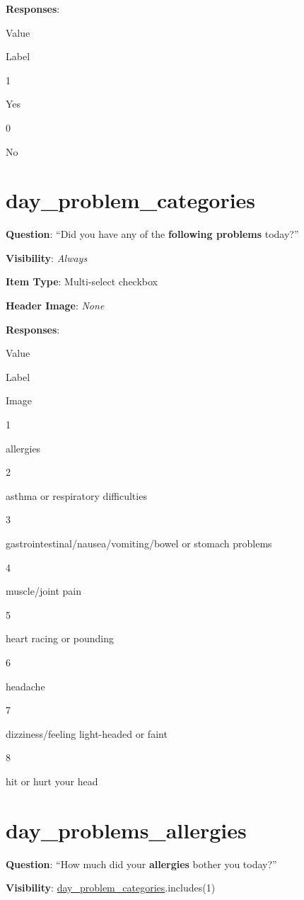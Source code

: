 \documentclass[]{book}
\begin{document}
\textbf{Responses}:

Value

Label

1

Yes

0

No

\hypertarget{day_problem_categories}{%
\section{day\_problem\_categories}\label{day_problem_categories}}

\textbf{Question}: ``Did you have any of the \textbf{following problems} today?''

\textbf{Visibility}: \emph{Always}

\textbf{Item Type}: Multi-select checkbox

\textbf{Header Image}: \emph{None}

\textbf{Responses}:

Value

Label

Image

1

allergies

2

asthma or respiratory difficulties

3

gastrointestinal/nausea/vomiting/bowel or stomach problems

4

muscle/joint pain

5

heart racing or pounding

6

headache

7

dizziness/feeling light-headed or faint

8

hit or hurt your head

\hypertarget{day_problems_allergies}{%
\section{day\_problems\_allergies}\label{day_problems_allergies}}

\textbf{Question}: ``How much did your \textbf{allergies} bother you today?''

\textbf{Visibility}: \protect\hyperlink{day_problem_categories}{day\_problem\_categories}.includes(1)
\end{document}
